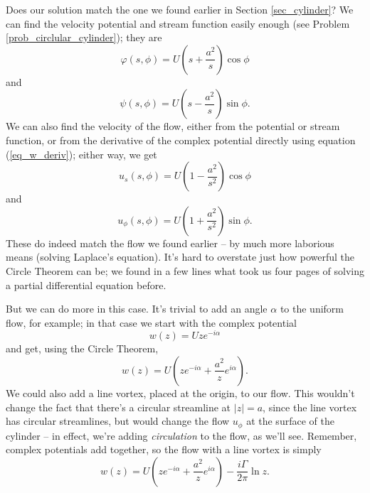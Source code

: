 Does our solution match the one we found earlier in Section \ref{sec_cylinder}?  We can find the velocity potential and stream function easily enough (see Problem \ref{prob_circlular_cylinder}); they are
\begin{equation}
\varphi(s, \phi) = U \left( s + \frac{a^2}{s} \right) \cos\phi
\end{equation}
and
\begin{equation}
\psi(s, \phi) = U \left( s - \frac{a^2}{s} \right) \sin\phi.
\end{equation}
We can also find the velocity of the flow, either from the potential or stream function, or from the derivative of the complex potential directly using equation (\ref{eq_w_deriv}); either way, we get
\begin{equation}
u_s(s, \phi) = U \left( 1 - \frac{a^2}{s^2} \right) \cos\phi
\end{equation}
and
\begin{equation}
u_\phi(s, \phi) = U \left( 1 + \frac{a^2}{s^2} \right) \sin\phi.
\end{equation}
These do indeed match the flow we found earlier -- by much more laborious means (solving Laplace's equation).  It's hard to overstate just how powerful the Circle Theorem can be; we found in a few lines what took us four pages of solving a partial differential equation before.

But we can do more in this case.  It's trivial to add an angle $\alpha$ to the uniform flow, for example; in that case we start with the complex potential
\[
w(z) = Uz e^{-i\alpha}
\]
and get, using the Circle Theorem,
\begin{equation}
w(z) = U \left( ze^{-i\alpha} + \frac{a^2}{z}e^{i\alpha} \right).
\end{equation}
We could also add a line vortex, placed at the origin, to our flow.  This wouldn't change the fact that there's a circular streamline at $|z| = a$, since the line vortex has circular streamlines, but would change the flow $u_\phi$ at the surface of the cylinder -- in effect, we're adding \emph{circulation} to the flow, as we'll see.  Remember, complex potentials add together, so the flow with a line vortex is simply
\begin{equation}
\label{eq_uniform_circle}
w(z) = U \left( ze^{-i\alpha} + \frac{a^2}{z}e^{i\alpha} \right) - \frac{i\Gamma}{2\pi} \ln z.
\end{equation}

